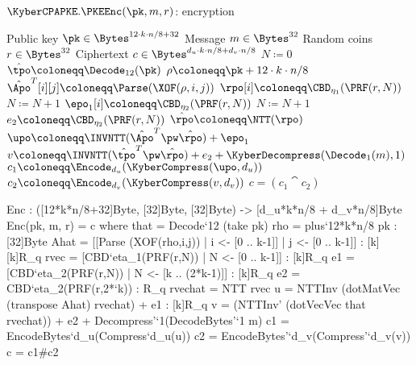 \begin{algorithm}
  \caption{$\KyberCPAPKE.\PKEEnc(\pk, m, r)$: encryption
  \label{kybercpa-enc}}
  \begin{algorithmic}[1]
    \Require Public key $\pk \in \Bytes^{12\cdot k\cdot n/8 + 32}$
    \Require Message $m \in \Bytes^{32}$
    \Require Random coins $r \in \Bytes^{32}$
    \Ensure Ciphertext $c \in \Bytes^{d_u\cdot k\cdot n/8 + d_v\cdot n/8}$
    \State $N \coloneqq 0$
    \State $\hat{\tpo} \coloneqq \Decode_{12}(\pk)$
    \State $\rho \coloneqq \pk+12\cdot k\cdot n/8$
               
      \State $\hat{\Apo}^T[i][j] \coloneqq \Parse(\XOF(\rho, i, j))$     
    \EndFor
    \EndFor
    \label{line:kybercpa-enc:rpo}       
      \State $\rpo[i] \coloneqq \CBD_{\eta_1}(\PRF(r, N))$
      \State $N \coloneqq N+1$
    \EndFor
    \label{line:kybercpa-enc:epo}       
      \State $\epo_1[i] \coloneqq \CBD_{\eta_2}(\PRF(r, N))$
      \State $N \coloneqq N+1$
    \EndFor
    \State $e_2 \coloneqq \CBD_{\eta_2}(\PRF(r, N))$                 
    \State $\hat{\rpo} \coloneqq \NTT(\rpo)$\label{line:kybercpa-enc:nttr}
    \State $\upo \coloneqq \INVNTT(\hat{\Apo}^T \pw \hat{\rpo}) + \epo_1$\label{line:kybercpa-enc:invnttar} 
    \State $v \coloneqq \INVNTT(\hat{\tpo}^T\pw\hat{\rpo}) + e_2 + \KyberDecompress(\Decode_1(m),1)$ \label{line:kybercpa-enc:v} 
    \State $c_1 \coloneqq \Encode_{d_u}(\KyberCompress(\upo, d_u))$
    \State $c_2 \coloneqq \Encode_{d_v}(\KyberCompress(v, d_v))$
    \State \Return $c = (c_1\cat c_2)$ 
  \end{algorithmic}
\end{algorithm}

\begin{code}
  Enc : ([12*k*n/8+32]Byte, [32]Byte, [32]Byte) -> [d_u*k*n/8 + d_v*n/8]Byte
  Enc(pk, m, r) = c where
    that = Decode`{12} (take pk)
    rho = plus`{12*k*n/8} pk : [32]Byte
    Ahat = [[Parse (XOF(rho,i,j)) | i <- [0 .. k-1]] | j <- [0 .. k-1]] : [k][k]R_q
    rvec = [CBD`{eta_1}(PRF(r,N)) | N <- [0 .. k-1]] : [k]R_q
    e1 = [CBD`{eta_2}(PRF(r,N)) | N <- [k .. (2*k-1)]] : [k]R_q
    e2 = CBD`{eta_2}(PRF(r,2*`k)) : R_q
    rvechat = NTT rvec
    u = NTTInv (dotMatVec (transpose Ahat) rvechat) + e1 : [k]R_q
    v = (NTTInv' (dotVecVec that rvechat)) + e2 + Decompress'`{1}(DecodeBytes'`{1} m)
    c1 = EncodeBytes`{d_u}(Compress`{d_u}(u))
    c2 = EncodeBytes'`{d_v}(Compress'`{d_v}(v))
    c = c1#c2
\end{code}

